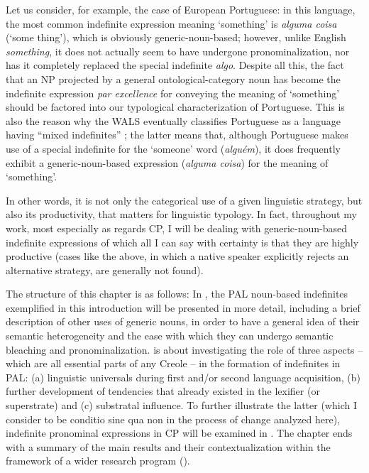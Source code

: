\documentclass[output=paper,colorlinks,citecolor=brown]{langscibook}
\begin{document}
Let us consider, for example, the case of European Portuguese: in this language, the most common indefinite expression meaning ‘something’ is \textit{alguma coisa} (‘some thing’), which is obviously generic-noun-based; however, unlike English \textit{something}, it does not actually seem to have undergone pronominalization, nor has it completely replaced the special indefinite \textit{algo}. Despite all this, the fact that an NP projected by a general ontological-category noun has become the indefinite expression \textit{par excellence} for conveying the meaning of ‘something’ should be factored into our typological characterization of Portuguese. This is also the reason why the WALS eventually classifies Portuguese as a language having “mixed indefinites” \citep[§2.4]{Haspelmath2013}; the latter means that, although Portuguese makes use of a special indefinite for the ‘someone’ word (\textit{alguém}), it does frequently exhibit a generic-noun-based expression (\textit{alguma coisa}) for the meaning of ‘something’. 

In other words, it is not only the categorical use of a given linguistic strategy, but also its productivity, that matters for linguistic typology. In fact, throughout my work, most especially as regards CP, I will be dealing with generic-noun-based indefinite expressions of which all I can say with certainty is that they are highly productive (cases like the above, in which a native speaker explicitly rejects an alternative strategy, are generally not found). 

The structure of this chapter is as follows: In , the PAL noun-based indefinites exemplified in this introduction will be presented in more detail, including a brief description of other uses of generic nouns, in order to have a general idea of their semantic heterogeneity and the ease with which they can undergo semantic bleaching and pronominalization.  is about investigating the role of three aspects – which are all essential parts of any Creole – in the formation of indefinites in PAL: (a) linguistic universals during first and/or second language acquisition, (b) further development of tendencies that already existed in the lexifier (or superstrate) and (c) substratal influence. To further illustrate the latter (which I consider to be conditio sine qua non in the process of change analyzed here), indefinite pronominal expressions in CP will be examined in . The chapter ends with a summary of the main results and their contextualization within the framework of a wider research program (). 
\end{document}
